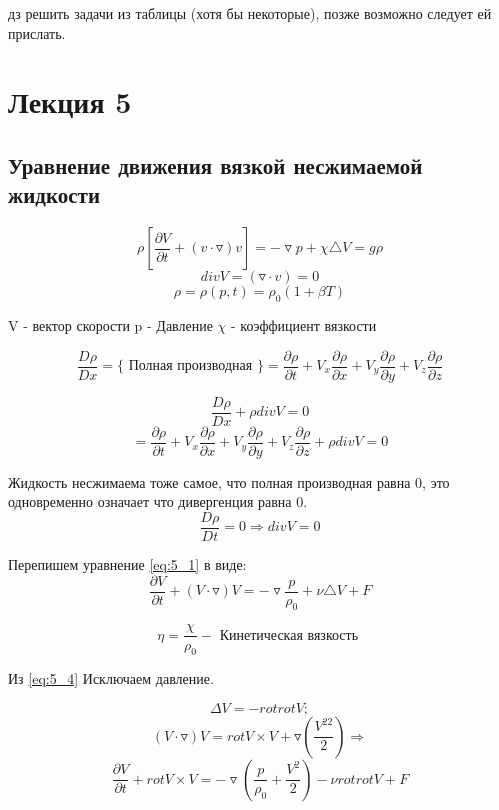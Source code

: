 \documentclass[12pt, a4paper]{article}
\begin{document}
дз решить задачи из таблицы (хотя бы некоторые), позже возможно следует ей прислать.

\section{Лекция 5}

\subsection{Уравнение движения вязкой несжимаемой жидкости}

\begin{equation}\label{eq:5_1}
\rho [\frac{\partial V }{\partial t } + (v \cdot \triangledown)v] = - \triangledown p + \chi \triangle V = g \rho
\end{equation}
\begin{equation}\label{eq:5_2}
div V = (\triangledown \cdot v) = 0
\end{equation}
\begin{equation}\label{eq:5_3}
\rho = \rho(p, t) = \rho_0 (1 + \beta T) 
\end{equation}

V - вектор скорости
p - Давление
$ \chi $ - коэффициент вязкости

\[ \frac{D \rho}{D x} = \{ \textrm{ Полная производная  } \} = \frac{\partial \rho}{\partial t} + V_x \frac{\partial \rho}{\partial x} + V_y \frac{\partial \rho}{\partial y} + V_z \frac{\partial \rho}{\partial z} \]

\[  \frac{D \rho}{D x} + \rho div V = 0 \]
\[ = \frac{\partial \rho}{\partial t} + V_x \frac{\partial \rho}{\partial x} + V_y \frac{\partial \rho}{\partial y} + V_z \frac{\partial \rho}{\partial z} + \rho div V = 0\]

Жидкость несжимаема тоже самое, что полная производная равна 0, это одновременно означает что дивергенция равна 0. 
\[ \frac{D\rho}{Dt} = 0 \Rightarrow div V = 0 \]

Перепишем уравнение \ref{eq:5_1} в виде:
\[ \frac{\partial V}{\partial t} + (V \cdot \triangledown) V = - \triangledown \frac{p}{\rho_0} + \nu \triangle V + F \]

\begin{equation}\label{eq:5_4}
\eta = \frac{\chi}{\rho_0} - \textrm{ Кинетическая вязкость }
\end{equation}

Из \ref{eq:5_4} Исключаем давление. 

\[ \Delta V = - rotrot V; \]
\[ (V \cdot \triangledown) V = rot V \times V + \triangledown(\frac{V^22}{2}) \Rightarrow \]
\begin{equation}\label{eq:5_5}
\frac{\partial V}{\partial t} + rot V \times V = -\triangledown (\frac{p}{\rho_0} + \frac{V^2}{2}) - \nu rot rot V + F
\end{equation}
\end{document}

